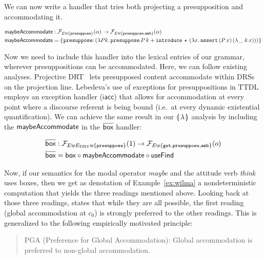 We can now write a handler that tries both projecting a presupposition and
accommodating it.

\begin{align*}
  \maybeAccommodate &: \FF_{E \uplus \{\op{presuppose}\}}(\alpha) \to
                      \FF_{E \uplus \{\op{presuppose},\op{amb}\}}(\alpha) \\
  \maybeAccommodate &= \banana{\onto{\op{presuppose}}{(\lam{P k}{
    \app{\op{presuppose}}{P}{k} +
    \app{\op{introduce}}{\star}{(\lam{x}{\app{\op{assert}}{(\ap{P}{x})}{(\lam{\_}{\ap{k}{x}})}})}})}}
\end{align*}

Now we need to include this handler into the lexical entries of our
grammar, wherever presuppositions can be accommodated. Here, we can follow
existing analyses. Projective DRT~\cite{venhuizen2013parsimonious} lets
presupposed content accommodate within DRSs on the projection
line. Lebedeva's use of exceptions for presuppositions in
TTDL~\cite{lebedeva2012expression} employs an exception handler
($\textsf{iacc}$) that allows for accommodation at every point where a
discourse referent is being bound (i.e.\ at every dynamic existential
quantification). We can achieve the same result in our $\llparenthesis \, \lambda \, \rrparenthesis$
analysis by including the $\textsf{maybeAccommodate}$ in the $\overline{\textsf{box}}$ handler:

\begin{align*}
  \overline{\textsf{box}} &: \mathcal{F}_{E \uplus E_{\mathrm{DRT}} \uplus \{\mathtt{presuppose}\}}(1) \to \mathcal{F}_{E \uplus \{\mathtt{get}, \mathtt{presuppose}, \mathtt{amb}\}}(o) \\
  \overline{\textsf{box}} &= \textsf{box} \circ \textsf{maybeAccommodate} \circ \textsf{useFind}
\end{align*}

Now, if our semantics for the modal operator \emph{maybe} and the attitude
verb \emph{think} uses boxes, then we get as denotation of
Example~\ref{ex:wilma} a nondeterministic computation that yields the three
readings mentioned above. Looking back at those three readings,
\cite{sep-presupposition} states that while they are all possible, the
first reading (global accommodation at $c_0$) is strongly preferred to the
other readings. This is generalized to the following empirically motivated
principle:

\begin{quote}
PGA (Preference for Global Accommodation): Global accommodation is
preferred to non-global accommodation.
\end{quote}


